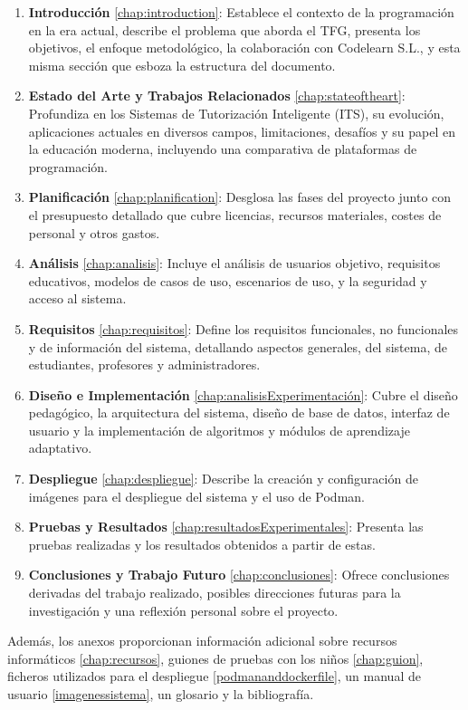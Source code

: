 \begin{enumerate}
    \item  \textbf{Introducción} \ref{chap:introduction}: Establece el contexto de la programación en la era actual, describe el problema que aborda el TFG, presenta los objetivos, el enfoque metodológico, la colaboración con Codelearn S.L., y esta misma sección que esboza la estructura del documento.
    \item  \textbf{Estado del Arte y Trabajos Relacionados} \ref{chap:stateoftheart}: Profundiza en los Sistemas de Tutorización Inteligente (ITS), su evolución, aplicaciones actuales en diversos campos, limitaciones, desafíos y su papel en la educación moderna, incluyendo una comparativa de plataformas de programación.
    \item \textbf{Planificación} \ref{chap:planification}: Desglosa las fases del proyecto junto con el presupuesto detallado que cubre licencias, recursos materiales, costes de personal y otros gastos.
    \item \textbf{Análisis} \ref{chap:analisis}: Incluye el análisis de usuarios objetivo, requisitos educativos, modelos de casos de uso, escenarios de uso, y la seguridad y acceso al sistema.
    \item \textbf{Requisitos} \ref{chap:requisitos}: Define los requisitos funcionales, no funcionales y de información del sistema, detallando aspectos generales, del sistema, de estudiantes, profesores y administradores.
    \item \textbf{Diseño e Implementación} \ref{chap:analisisExperimentación}: Cubre el diseño pedagógico, la arquitectura del sistema, diseño de base de datos, interfaz de usuario y la implementación de algoritmos y módulos de aprendizaje adaptativo.
    \item  \textbf{Despliegue} \ref{chap:despliegue}: Describe la creación y configuración de imágenes para el despliegue del sistema y el uso de Podman.
    \item \textbf{Pruebas y Resultados} \ref{chap:resultadosExperimentales}: Presenta las pruebas realizadas y los resultados obtenidos a partir de estas.
    \item \textbf{Conclusiones y Trabajo Futuro} \ref{chap:conclusiones}: Ofrece conclusiones derivadas del trabajo realizado, posibles direcciones futuras para la investigación y una reflexión personal sobre el proyecto.
\end{enumerate}    

Además, los anexos proporcionan información adicional sobre recursos informáticos \ref{chap:recursos}, guiones de pruebas con los niños \ref{chap:guion}, ficheros utilizados para el despliegue \ref{podmananddockerfile}, un manual de usuario \ref{imagenessistema}, un glosario y la bibliografía.